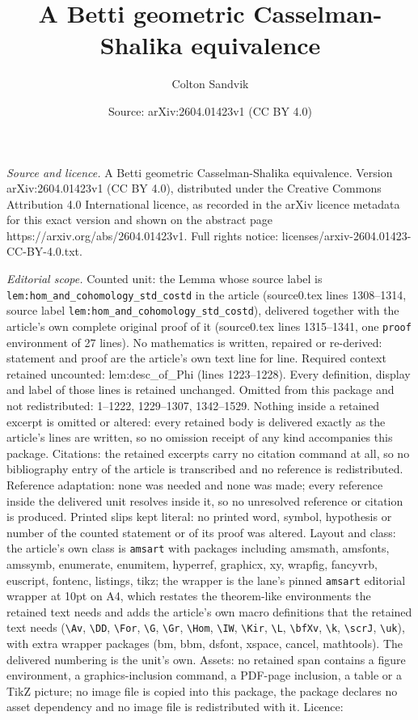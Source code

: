 \documentclass[10pt,a4paper]{amsart}
\title[A Betti geometric Casselman-Shalika equivalence]{A Betti geometric Casselman-Shalika equivalence}
\author{Colton Sandvik}
\date{Source: arXiv:2604.01423v1 (CC BY 4.0)}
\begin{document}
\maketitle

\noindent\emph{Source and licence.} A Betti geometric Casselman-Shalika equivalence. Version arXiv:2604.01423v1 (CC BY 4.0), distributed under the Creative Commons Attribution 4.0 International licence, as recorded in the arXiv licence metadata for this exact version and shown on the abstract page https://arxiv.org/abs/2604.01423v1. Full rights notice: licenses/arxiv-2604.01423-CC-BY-4.0.txt.\par\smallskip

\noindent\textit{Editorial scope.} Counted unit: the Lemma whose source label is \texttt{lem:hom\_and\_cohomology\_std\_costd} in the article (source0.tex lines 1308--1314, source label \texttt{lem:hom\_and\_cohomology\_std\_costd}), delivered together with the article's own complete original proof of it (source0.tex lines 1315--1341, one \texttt{proof} environment of 27 lines). No mathematics is written, repaired or re-derived: statement and proof are the article's own text line for line. Required context retained uncounted: lem:desc\_of\_Phi (lines 1223--1228). Every definition, display and label of those lines is retained unchanged. Omitted from this package and not redistributed: 1--1222, 1229--1307, 1342--1529. Nothing inside a retained excerpt is omitted or altered: every retained body is delivered exactly as the article's lines are written, so no omission receipt of any kind accompanies this package. Citations: the retained excerpts carry no citation command at all, so no bibliography entry of the article is transcribed and no reference is redistributed. Reference adaptation: none was needed and none was made; every reference inside the delivered unit resolves inside it, so no unresolved reference or citation is produced. Printed slips kept literal: no printed word, symbol, hypothesis or number of the counted statement or of its proof was altered. Layout and class: the article's own class is \texttt{amsart} with packages including amsmath, amsfonts, amssymb, enumerate, enumitem, hyperref, graphicx, xy, wrapfig, fancyvrb, euscript, fontenc, listings, tikz; the wrapper is the lane's pinned \texttt{amsart} editorial wrapper at 10pt on A4, which restates the theorem-like environments the retained text needs and adds the article's own macro definitions that the retained text needs (\texttt{\textbackslash Av}, \texttt{\textbackslash DD}, \texttt{\textbackslash For}, \texttt{\textbackslash G}, \texttt{\textbackslash Gr}, \texttt{\textbackslash Hom}, \texttt{\textbackslash IW}, \texttt{\textbackslash Kir}, \texttt{\textbackslash L}, \texttt{\textbackslash bfXv}, \texttt{\textbackslash k}, \texttt{\textbackslash scrJ}, \texttt{\textbackslash uk}), with extra wrapper packages (bm, bbm, dsfont, xspace, cancel, mathtools). The delivered numbering is the unit's own. Assets: no retained span contains a figure environment, a graphics-inclusion command, a PDF-page inclusion, a table or a TikZ picture; no image file is copied into this package, the package declares no asset dependency and no image file is redistributed with it. Licence: 
\end{document}

